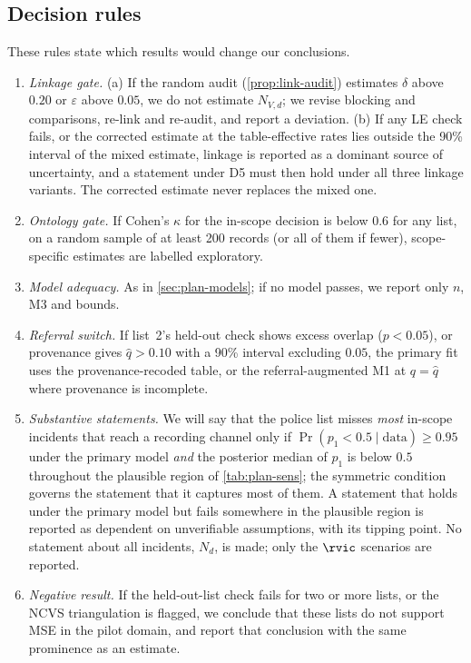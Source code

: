 \subsection{Decision rules}\label{sec:plan-decisions}

These rules state which results would change our conclusions.
\begin{enumerate}[D1.]
  \item \emph{Linkage gate.} (a) If the random audit (\cref{prop:link-audit}) estimates $\delta$ above $0.20$ or $\varepsilon$ above $0.05$, we do not estimate $N_{V,d}$; we revise blocking and comparisons, re-link and re-audit, and report a deviation. (b) If any LE check fails, or the corrected estimate at the table-effective rates lies outside the 90\% interval of the mixed estimate, linkage is reported as a dominant source of uncertainty, and a statement under D5 must then hold under all three linkage variants. The corrected estimate never replaces the mixed one.
  \item \emph{Ontology gate.} If Cohen's $\kappa$ for the in-scope decision is below $0.6$ for any list, on a random sample of at least 200 records (or all of them if fewer), scope-specific estimates are labelled exploratory.
  \item \emph{Model adequacy.} As in \cref{sec:plan-models}; if no model passes, we report only $n$, M3 and bounds.
  \item \emph{Referral switch.} If list~2's held-out check shows excess overlap ($p<0.05$), or provenance gives $\hat q>0.10$ with a 90\% interval excluding $0.05$, the primary fit uses the provenance-recoded table, or the referral-augmented M1 at $q=\hat q$ where provenance is incomplete.
  \item \emph{Substantive statements.} We will say that the police list misses \emph{most} in-scope incidents that reach a recording channel only if $\Pr(p_1<0.5\mid\text{data})\ge 0.95$ under the primary model \emph{and} the posterior median of $p_1$ is below $0.5$ throughout the plausible region of \cref{tab:plan-sens}; the symmetric condition governs the statement that it captures most of them. A statement that holds under the primary model but fails somewhere in the plausible region is reported as dependent on unverifiable assumptions, with its tipping point. No statement about all incidents, $N_d$, is made; only the $\rvic$ scenarios are reported.
  \item \emph{Negative result.} If the held-out-list check fails for two or more lists, or the NCVS triangulation is flagged, we conclude that these lists do not support MSE in the pilot domain, and report that conclusion with the same prominence as an estimate.
\end{enumerate}

